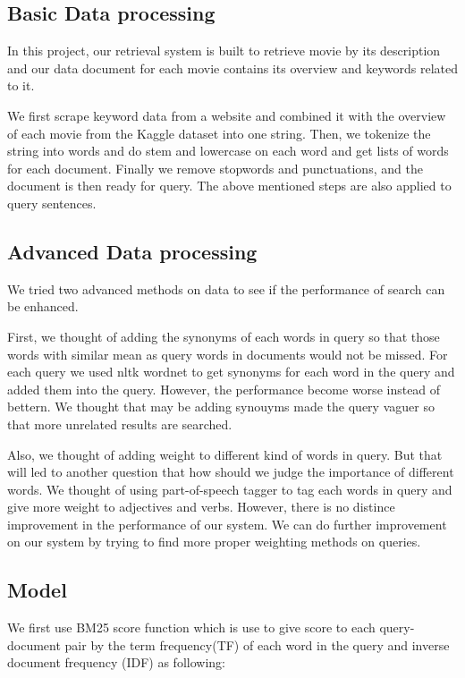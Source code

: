 \documentclass[letterpaper,10pt]{article}
\begin{document}
\begin{multicols}{2}
    \subsection{Basic Data processing}

    In this project, our retrieval system is built to retrieve movie by its description and our data document for each movie contains its overview and keywords related to it.

    We first scrape keyword data from a website and combined it with the overview of each movie from the Kaggle dataset into one string. Then, we tokenize the string into words and do stem and lowercase on each word and get lists of words for each document. Finally we remove stopwords and punctuations, and  the document is then ready for query. The above mentioned steps are also applied to query sentences.

    \subsection{Advanced Data processing}

    We tried two advanced methods on data to see if the performance of search can be enhanced.

    First, we thought of adding the synonyms of each words in query so that those words with similar mean as query words in documents would not be missed. For each query we used nltk wordnet to get synonyms for each word in the query and added them into the query. However, the performance become worse instead of bettern. We thought that may be adding synouyms made the query vaguer so that more unrelated results are searched.

    Also, we thought of adding weight to different kind of words in query. But that will led to another question that how should we judge the importance of different words. We thought of using part-of-speech tagger to tag each words in query and give more weight to adjectives and verbs. However, there is no distince improvement in the performance of our system. We can do further improvement on our system by trying to find more proper weighting methods on queries.

    \subsection{Model}

    We first use BM25 score function which is use to give score to each query-document pair by the term frequency(TF) of each word in the query and inverse document frequency (IDF) as following:


\end{multicols}
\end{document}
